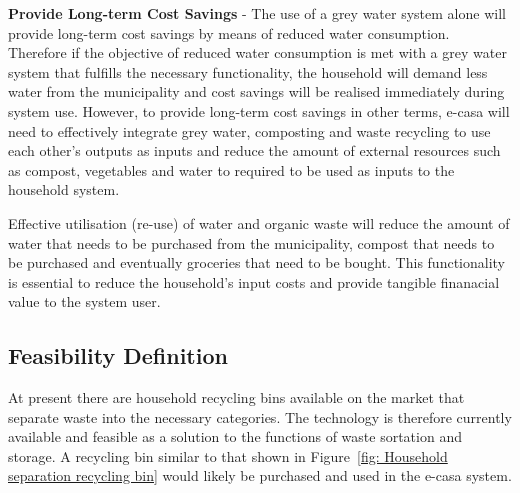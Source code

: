 \documentclass[a4paper,11pt,fleqn]{report}
\begin{document}
\noindent\textbf{Provide Long-term Cost Savings} - The use of a grey water system alone will provide long-term cost savings by means of reduced water consumption. Therefore if the objective of reduced water consumption is met with a grey water system that fulfills the necessary functionality, the household will demand less water from the municipality and cost savings will be realised immediately during system use. However, to provide long-term cost savings in other terms, \ac{e-casa} will need to effectively integrate grey water, composting and waste recycling to use each other's outputs as inputs and reduce the amount of external resources such as compost, vegetables and water to required to be used as inputs to the household system.

Effective utilisation (re-use) of water and organic waste will reduce the amount of water that needs to be purchased from the municipality, compost that needs to be purchased and eventually groceries that need to be bought. This functionality is essential to reduce the household's input costs and provide tangible finanacial value to the system user.

\subsection{Feasibility Definition}
At present there are household recycling bins available on the market that separate waste into the necessary categories. The technology is therefore currently available and feasible as a solution to the functions of waste sortation and storage. A recycling bin similar to that shown in Figure~\ref{fig: Household separation recycling bin} would likely be purchased and used in the \ac{e-casa} system.
\end{document}
